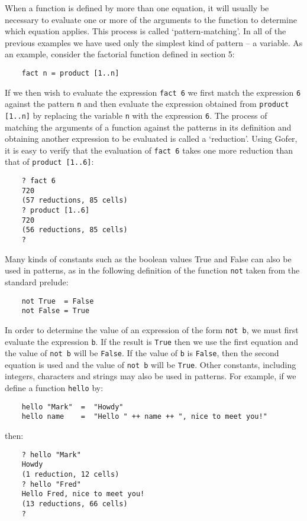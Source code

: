 When a function is defined by more than one equation, it  will  usually
be necessary to evaluate one or more of the arguments to  the  function
to  determine  which  equation  applies.   This   process   is   called
`pattern-matching'.  In all of the previous examples we have used  only
the simplest kind of pattern -- a variable.  As  an  example,  consider
the factorial function defined in section 5:
\begin{verbatim}
    fact n = product [1..n]
\end{verbatim}
If we then wish to evaluate the expression \verb"fact 6" we first match  the
expression \verb"6" against the pattern \verb"n" 
and then evaluate the expression
obtained from \verb"product [1..n]" by replacing 
the variable \verb"n"  with  the
expression \verb"6".  The process of matching the arguments  of  a  function
against the patterns in its definition and obtaining another expression
to be evaluated is called a `reduction'.  Using Gofer, it  is  easy  to
verify that the evaluation of \verb"fact 6" takes one  more  reduction  than
that of \verb"product [1..6]":
\begin{verbatim}
    ? fact 6
    720
    (57 reductions, 85 cells)
    ? product [1..6]
    720
    (56 reductions, 85 cells)
    ? 
\end{verbatim}
Many kinds of constants such as the boolean values True and  False  can
also be used in  patterns,  as  in  the  following  definition  of  the
function \verb"not" taken from the standard prelude:
\begin{verbatim}
    not True  = False
    not False = True
\end{verbatim}
In order to determine the value of an expression of the form  \verb"not b",
we must first evaluate the expression \verb"b".  If  the  result  is  \verb"True"
then we use the first equation  and  the  value  of  \verb"not b"  will  be
\verb"False".  If the value of \verb"b" is \verb"False", then the second  equation  is
used and the value of \verb"not b" will be \verb"True".
Other constants, including integers, characters and strings may also be
used in patterns.  For example, if we define a function \verb"hello" by:
\begin{verbatim}
    hello "Mark"  =  "Howdy"
    hello name    =  "Hello " ++ name ++ ", nice to meet you!"
\end{verbatim}
then:
\begin{verbatim}
    ? hello "Mark"
    Howdy
    (1 reduction, 12 cells)
    ? hello "Fred"
    Hello Fred, nice to meet you!
    (13 reductions, 66 cells)
    ?
\end{verbatim}
